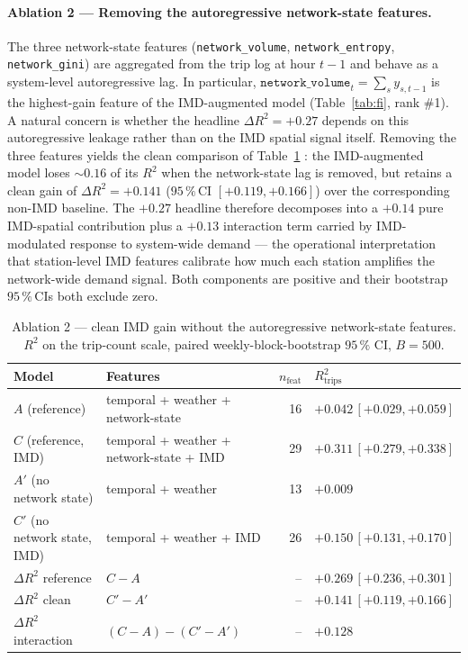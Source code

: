 \documentclass[11pt,a4paper]{article}
\begin{document}
\paragraph{Ablation 2 — Removing the autoregressive network-state
features.}
The three network-state features
(\texttt{network\_volume}, \texttt{network\_entropy},
\texttt{network\_gini}) are aggregated from the trip log at hour
$t - 1$ and behave as a system-level autoregressive lag.  In
particular, $\texttt{network\_volume}_t = \sum_s y_{s, t-1}$ is
the highest-gain feature of the IMD-augmented model
(Table~\ref{tab:fi}, rank \#1).  A natural concern is whether
the headline $\Delta R^2 = +0.27$ depends on this
autoregressive leakage rather than on the IMD spatial signal
itself.  Removing the three features yields the clean comparison
of Table~\ref{tab:ablation-net} : the IMD-augmented model loses
$\sim 0.16$ of its $R^2$ when the network-state lag is removed,
but retains a clean gain of $\Delta R^2 = +0.141$
($95\,\%$\,CI $[+0.119, +0.166]$) over the corresponding non-IMD
baseline.  The $+0.27$ headline therefore decomposes into a
$+0.14$ pure IMD-spatial contribution plus a $+0.13$ interaction
term carried by IMD-modulated response to system-wide demand —
the operational interpretation that station-level IMD features
calibrate how much each station amplifies the network-wide
demand signal.  Both components are positive and their
bootstrap $95\,\%$\,CIs both exclude zero.

\begin{table}[H]
\centering
\caption{Ablation 2 — clean IMD gain without the
autoregressive network-state features.  $R^2$ on the trip-count
scale, paired weekly-block-bootstrap $95\,\%$ CI, $B = 500$.}
\label{tab:ablation-net}
\small
\begin{tabular}{@{}llrl@{}}
\toprule
Model & Features & $n_{\mathrm{feat}}$ & $R^2_{\mathrm{trips}}$ \\
\midrule
$A$  (reference)             & temporal + weather + network-state            & 16 & $+0.042\,[+0.029, +0.059]$ \\
$C$  (reference, IMD)        & temporal + weather + network-state + IMD       & 29 & $+0.311\,[+0.279, +0.338]$ \\
$A'$ (no network state)      & temporal + weather                              & 13 & $+0.009$ \\
$C'$ (no network state, IMD) & temporal + weather + IMD                       & 26 & $+0.150\,[+0.131, +0.170]$ \\
\midrule
$\Delta R^2$ reference       & $C - A$                                          & -- & $+0.269\,[+0.236, +0.301]$ \\
$\Delta R^2$ clean           & $C' - A'$                                        & -- & $+0.141\,[+0.119, +0.166]$ \\
$\Delta R^2$ interaction     & $(C-A) - (C'-A')$                                & -- & $+0.128$ \\
\bottomrule
\end{tabular}
\end{table}
\end{document}
